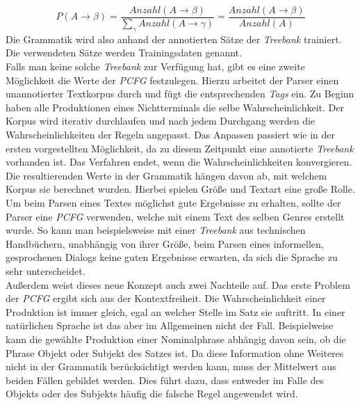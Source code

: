 \begin{equation}
P(A \to \beta) = \frac{Anzahl(A \to \beta)}{ \sum_{\gamma} Anzahl(A \to \gamma)} = \frac{Anzahl(A \to \beta)}{Anzahl(A)}
\end{equation}
Die Grammatik wird also anhand der annotierten Sätze der \textit{Treebank} trainiert. Die verwendeten Sätze werden Trainingsdaten genannt. \\
Falls man keine solche \textit{Treebank} zur Verfügung hat, gibt es eine zweite Möglichkeit die Werte der \textit{PCFG} festzulegen. Hierzu arbeitet der Parser einen unannotierter Textkorpus durch und fügt die entsprechenden \textit{Tags} ein. Zu Beginn haben alle Produktionen eines Nichtterminals die selbe Wahrscheinlichkeit. Der Korpus wird iterativ durchlaufen und nach jedem Durchgang werden die Wahrscheinlichkeiten der Regeln angepasst. Das Anpassen passiert wie in der ersten vorgestellten Möglichkeit, da zu diesem Zeitpunkt eine annotierte \textit{Treebank} vorhanden ist. Das Verfahren endet, wenn die Wahrscheinlichkeiten konvergieren. \\
Die resultierenden Werte in der Grammatik hängen davon ab, mit welchem Korpus sie berechnet wurden. Hierbei spielen Größe und Textart eine große Rolle. Um beim Parsen eines Textes möglichst gute Ergebnisse zu erhalten, sollte der Parser eine \textit{PCFG} verwenden, welche mit einem Text des selben Genres erstellt wurde. So kann man beispielsweise mit einer \textit{Treebank} aus technischen Handbüchern, unabhängig von ihrer Größe, beim Parsen eines informellen, gesprochenen Dialogs keine guten Ergebnisse erwarten, da sich die Sprache zu sehr unterscheidet.\\ 
Außerdem weist dieses neue Konzept auch zwei Nachteile auf.
Das erste Problem der \textit{PCFG} ergibt sich aus der Kontextfreiheit. Die Wahrscheinlichkeit einer Produktion ist immer gleich, egal an welcher Stelle im Satz sie auftritt. In einer natürlichen Sprache ist das aber im Allgemeinen nicht der Fall. Beispielweise kann die gewählte Produktion einer Nominalphrase abhängig davon sein, ob die Phrase Objekt oder Subjekt des Satzes ist. Da diese Information ohne Weiteres nicht in der Grammatik berücksichtigt werden kann, muss der Mittelwert aus beiden Fällen gebildet werden. Dies führt dazu, dass entweder im Falle des Objekts oder des Subjekts häufig die falsche Regel angewendet wird. \\
